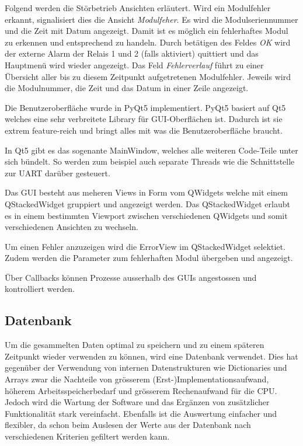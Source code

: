 Folgend werden  die St\"orbetrieb Ansichten erl\"autert. Wird  ein Modulfehler
erkannt,  signalisiert   dies  die  Ansicht  \emph{Modulfeher}. Es   wird  die
Modulseriennummer und die Zeit mit Datum angezeigt. Damit ist es m\"oglich ein
fehlerhaftes Modul zu erkennen  und entsprechend zu handeln. Durch bet\"atigen
des  Feldes  \emph{OK} wird  der  externe  Alarm der  Relais  1  und 2  (falls
aktiviert)  quittiert  und das  Hauptmen\"u  wird  wieder angezeigt. Das  Feld
\emph{Fehlerverlauf}  f\"uhrt  zu  einer   \"Ubersicht  aller  bis  zu  diesem
Zeitpunkt aufgetretenen  Modulfehler. Jeweils wird  die Modulnummer,  die Zeit
und das Datum in einer Zeile angezeigt.

Die Benutzeroberfl\"ache  wurde in PyQt5 implementiert. PyQt5  basiert auf Qt5
welches eine sehr verbreitete Library f\"ur GUI-Oberfl\"achen ist. Dadurch ist
sie extrem  feature-reich und  bringt alles  mit was  die Benutzeroberfl\"ache
braucht.

In  Qt5 gibt  es das  sogenante MainWindow,  welches alle  weiteren Code-Teile
unter sich  b\"undelt. So werden  zum beispiel auch  separate Threads  wie die
Schnittstelle zur UART dar\"uber gesteuert.

Das  GUI besteht  aus meheren  Views  in Form  vom QWidgets  welche mit  einem
QStackedWidget gruppiert  und angezeigt werden. Das QStackedWidget  erlaubt es
in  einem  bestimmten  Viewport  zwischen  verschiedenen  QWidgets  und  somit
verschiedenen Ansichten zu wechseln.

Um   einen   Fehler   anzuzeigen   wird  die   ErrorView   im   QStackedWidget
selektiet. Zudem werden  die Parameter zum fehlerhaften  Modul \"ubergeben und
angezeigt.

\"Uber  Callbacks  k\"onnen  Prozesse  ausserhalb  des  GUIs  angestossen  und
kontrolliert werden.

\subsection{Datenbank}
\label{subsec:software:master:database}


Um  die  gesammelten  Daten  optimal  zu speichern  und  zu  einem  sp\"ateren
Zeitpunkt wieder  verwenden zu  k\"onnen, wird eine  Datenbank verwendet. Dies
hat gegen\"uber  der Verwendung von internen  Datenstrukturen wie Dictionaries
und Arrays  zwar die Nachteile von  gr\"osserem (Erst-)Implementationsaufwand,
h\"oherem  Arbeitsspeicherbedarf  und   gr\"osserem  Rechenaufwand  f\"ur  die
CPU. Jedoch   wird  die   Wartung  der   Software  und   das  Erg\"anzen   von
zus\"atzlicher   Funktionalit\"at   stark   vereinfacht. Ebenfalls   ist   die
Auswertung einfacher und  flexibler, da schon beim Auslesen der  Werte aus der
Datenbank nach verschiedenen Kriterien gefiltert werden kann.

